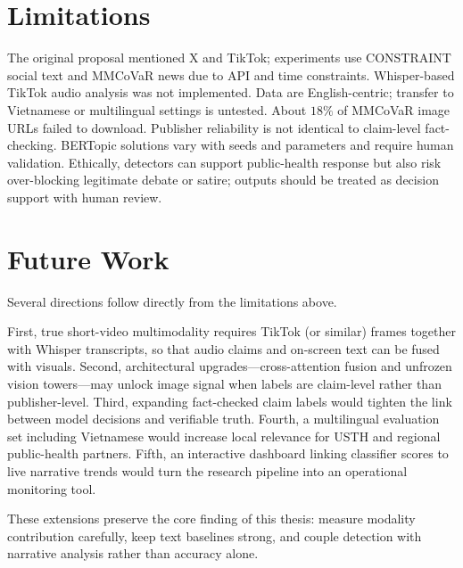 \documentclass[12pt, a4paper]{report}
\begin{document}
\section{Limitations}
\label{sec:limitations}

The original proposal mentioned X and TikTok; experiments use CONSTRAINT social text and MMCoVaR news due to API and time constraints.
Whisper-based TikTok audio analysis was not implemented.
Data are English-centric; transfer to Vietnamese or multilingual settings is untested.
About $18\%$ of MMCoVaR image URLs failed to download.
Publisher reliability is not identical to claim-level fact-checking.
BERTopic solutions vary with seeds and parameters and require human validation.
Ethically, detectors can support public-health response but also risk over-blocking legitimate debate or satire; outputs should be treated as decision support with human review.

\section{Future Work}
\label{sec:future-work}

Several directions follow directly from the limitations above.

First, true short-video multimodality requires TikTok (or similar) frames together with Whisper transcripts, so that audio claims and on-screen text can be fused with visuals.
Second, architectural upgrades---cross-attention fusion and unfrozen vision towers---may unlock image signal when labels are claim-level rather than publisher-level.
Third, expanding fact-checked claim labels would tighten the link between model decisions and verifiable truth.
Fourth, a multilingual evaluation set including Vietnamese would increase local relevance for USTH and regional public-health partners.
Fifth, an interactive dashboard linking classifier scores to live narrative trends would turn the research pipeline into an operational monitoring tool.

These extensions preserve the core finding of this thesis: measure modality contribution carefully, keep text baselines strong, and couple detection with narrative analysis rather than accuracy alone.

\clearpage

\printbibliography[title=References]
\end{document}
